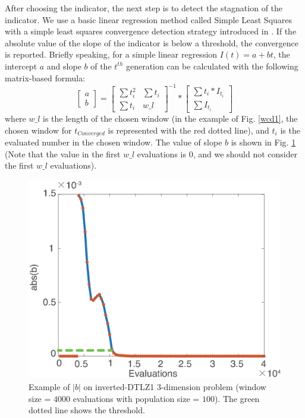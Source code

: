 \documentclass[conference]{IEEEtran}
\begin{document}
After choosing the indicator, the next step is to detect the stagnation of the indicator.
We use a basic linear regression method called Simple Least Squares\cite{SimpleLeastSquares} with a
simple least squares convergence detection strategy introduced in \cite{convergenceDetection:LSSC}.
If the absolute value of the slope of the indicator is below a threshold, the convergence is reported.
Briefly speaking, for a simple linear regression $I(t)=a+bt$, 
the intercept $a$ and slope $b$ of the $t^{th}$ generation can be calculated 
with the following matrix-based formula:
\begin{equation}\label{elr1}
  \left[
    \begin{matrix}
      a \\
      b
    \end{matrix}
  \right]
  = 
  \left[
    \begin{matrix}
      \sum t_i^2 & \sum t_i \\
      \sum t_i   & w\_ l 
    \end{matrix}
  \right]^{-1}
  *
  \left[
    \begin{matrix}
      \sum t_i * I_{t_i} \\
      \sum I_{t_i} 
    \end{matrix}
  \right]
\end{equation}
where $w\_ l$ is the length of the chosen window
(in the example of Fig. \ref{wcd1}, the chosen window for $t_{Converged}$ is represented with the red dotted line), 
and $t_i$ is the evaluated number in the chosen window.
The value of slope $b$ is shown in Fig. \ref{wcd2} 
(Note that the value in the first $w\_ l$ evaluations is 0, 
and we should not consider the first $w\_ l$ evaluations). 
\begin{figure}[!t]
  \centering
    \includegraphics[width=\columnwidth]{FVEMOA_IDTLZ1_M3_nadir_2}
  \caption{Example of $\lvert b\rvert$ on inverted-DTLZ1 3-dimension problem
  (window size = $4000$ evaluations with population size = $100$).
  The green dotted line shows the threshold.
  }
  \label{wcd2}
\end{figure}
\end{document}
